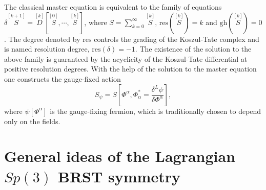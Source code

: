 \documentclass[a4paper,12pt]{article}
\begin{document}
The classical master equation is equivalent to the family of equations $%
\delta \stackrel{[k+1]}{S}=\stackrel{[k]}{D}\left[ \stackrel{[0]}{S},\cdots ,%
\stackrel{[k]}{S}\right] $, where $S=\sum\limits_{k=0}^{\infty }\stackrel{[k]%
}{S}$, $\mathrm{res}\left( \stackrel{[k]}{S}\right) =k$ and $\mathrm{gh}%
\left( \stackrel{[k]}{S}\right) =0$. The degree denoted by $\mathrm{res}$
controls the grading of the Koszul-Tate complex and is named resolution
degree, $\mathrm{res}\left( \delta \right) =-1$. The existence of the
solution to the above family is guaranteed by the acyclicity of the
Koszul-Tate differential at positive resolution degrees. With the help of
the solution to the master equation one constructs the gauge-fixed action 
\begin{equation}
S_{\psi }=S\left[ \Phi ^{\alpha },\Phi _{\alpha }^{*}=\frac{\delta ^{L}\psi 
}{\delta \Phi ^{\alpha }}\right] ,  \label{sp3.d5}
\end{equation}
where $\psi \left[ \Phi ^{\alpha }\right] $ is the gauge-fixing fermion,
which is traditionally chosen to depend only on the fields.

\section{General ideas of the Lagrangian $Sp(3)$ BRST symmetry}
\end{document}

